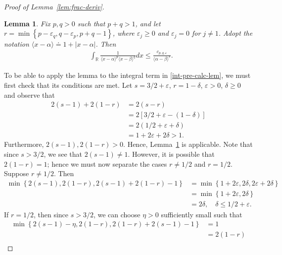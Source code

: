 \documentclass[12pt,reqno]{amsart}
\numberwithin{equation}{section}  %
\numberwithin{figure}{section}
\newcommand{\rr}{\mathbb{R}}
\newcommand{\ee}{\varepsilon}
\newtheorem{lemma}[theorem]{Lemma}
\begin{document}
\begin{proof}[Proof of Lemma~\ref{lem:frac-deriv}]
%
%
\begin{lemma}
	\label{lem:calc}
  Fix $p, q > 0$ such that $p +q >1$, and let $r =\min\left\{p - \ee_{q}, q - \ee_{p}, p+q-1
 \right\}$, where $\ee_{j} \ge 0$ and $\ee_{j} = 0$ for $j \neq 1$. Adopt the notation
 $\langle x - \alpha \rangle  \doteq 1 + | x - \alpha |$. Then 
  \begin{equation*}
\begin{split}
  & \int_{\rr} \frac{1}{\langle x - \alpha \rangle ^{p} \langle x -
  \beta \rangle
  ^{q}} d x
  \le \frac{c_{p,q, \ee}}{\langle \alpha - \beta \rangle ^{r}}. 
  \end{split}
\end{equation*}
\end{lemma}
To be able to apply the lemma to the integral term in \eqref{int-pre-calc-lem}, 
we must first check
that its conditions are met. Let $ s = 3/2 + \ee$, $r = 1- \delta$, $\ee > 0$, $
\delta \ge 0$ and observe that
%
%
\begin{equation*}
\begin{split}
2(s-1) + 2(1-r)
& = 2(s-r)
\\
& = 2[3/2 + \ee - (1 - \delta)]
\\
& = 2(1/2 + \ee + \delta)
\\
& = 1 + 2 \ee + 2 \delta > 1.
\end{split}
\end{equation*}
%
%
Furthermore, $2(s-1), 2(1-r) > 0$. Hence, Lemma~\ref{lem:calc} is applicable. 
Note that since $s > 3/2$, we see that $2(s-1) \neq 1$. However, it is possible that $2(1-r) =1$; hence we must now separate the cases $r \neq 1/2$ and $r = 1/2$. Suppose $r \neq 1/2$. Then 
%
%
\begin{equation*}
\begin{split}
  \min\left\{ 2(s-1), 2(1-r), 2(s-1) + 2(1-r) -1 \right\}
  & = \min\left\{ 1 + 2 \ee, 2 \delta, 2\ee + 2 \delta \right\}
  \\
  & = \min\left\{ 1 + 2 \ee, 2 \delta\right\}
  \\
  & = 2 \delta, \quad \delta \le 1/2 + \ee.
\end{split}
\end{equation*}
%
If $r = 1/2$, then since $s > 3/2$, we can choose $\eta > 0$ sufficiently small
such that
%
%
\begin{equation*}
\begin{split}
  \min\left\{ 2(s-1) -\eta , 2(1-r), 2(1-r) + 2(s-1) - 1  \right\}
  & = 1 
  \\
  & = 2(1 -r)
  \\

\end{split}
\end{equation*}
\end{proof}
\end{document}
